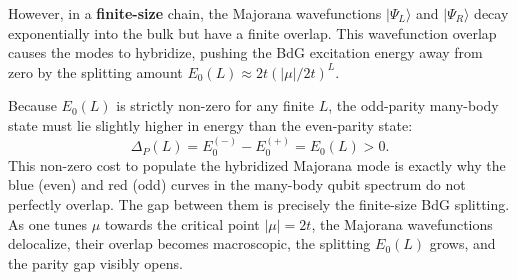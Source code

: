\documentclass[11pt]{article}
\newcommand{\ket}[1]{|#1\rangle}
\begin{document}
However, in a \textbf{finite-size} chain, the Majorana wavefunctions $\ket{\Psi_L}$ and $\ket{\Psi_R}$ decay exponentially into the bulk but have a finite overlap. This wavefunction overlap causes the modes to hybridize, pushing the BdG excitation energy away from zero by the splitting amount $E_0(L) \approx 2t(|\mu|/2t)^L$.

Because $E_0(L)$ is strictly non-zero for any finite $L$, the odd-parity many-body state must lie slightly higher in energy than the even-parity state:
\begin{equation}
  \Delta_P(L) = E_0^{(-)} - E_0^{(+)} = E_0(L) > 0.
\end{equation}
This non-zero cost to populate the hybridized Majorana mode is exactly why the blue (even) and red (odd) curves in the many-body qubit spectrum do not perfectly overlap. The gap between them is precisely the finite-size BdG splitting. As one tunes $\mu$ towards the critical point $|\mu| = 2t$, the Majorana wavefunctions delocalize, their overlap becomes macroscopic, the splitting $E_0(L)$ grows, and the parity gap visibly opens.
\end{document}

